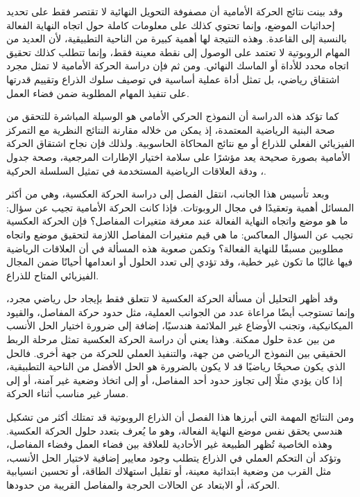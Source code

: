 وقد بينت نتائج الحركة الأمامية أن مصفوفة التحويل النهائية لا تقتصر فقط على تحديد إحداثيات الموضع، وإنما تحتوي كذلك على معلومات كاملة حول اتجاه النهاية الفعالة بالنسبة إلى القاعدة. وهذه النتيجة لها أهمية كبيرة من الناحية التطبيقية، لأن العديد من المهام الروبوتية لا تعتمد على الوصول إلى نقطة معينة فقط، وإنما تتطلب كذلك تحقيق اتجاه محدد للأداة أو الماسك النهائي. ومن ثم فإن دراسة الحركة الأمامية لا تمثل مجرد اشتقاق رياضي، بل تمثل أداة عملية أساسية في توصيف سلوك الذراع وتقييم قدرتها على تنفيذ المهام المطلوبة ضمن فضاء العمل.

كما تؤكد هذه الدراسة أن النموذج الحركي الأمامي هو الوسيلة المباشرة للتحقق من صحة البنية الرياضية المعتمدة، إذ يمكن من خلاله مقارنة النتائج النظرية مع التمركز الفيزيائي الفعلي للذراع أو مع نتائج المحاكاة الحاسوبية. ولذلك فإن نجاح اشتقاق الحركة الأمامية بصورة صحيحة يعد مؤشرًا على سلامة اختيار الإطارات المرجعية، وصحة جدول ، ودقة العلاقات الرياضية المستخدمة في تمثيل السلسلة الحركية.

وبعد تأسيس هذا الجانب، انتقل الفصل إلى دراسة الحركة العكسية، وهي من أكثر المسائل أهمية وتعقيدًا في مجال الروبوتات. فإذا كانت الحركة الأمامية تجيب عن سؤال: ما هو موضع واتجاه النهاية الفعالة عند معرفة متغيرات المفاصل؟ فإن الحركة العكسية تجيب عن السؤال المعاكس: ما هي قيم متغيرات المفاصل اللازمة لتحقيق موضع واتجاه مطلوبين مسبقًا للنهاية الفعالة؟ وتكمن صعوبة هذه المسألة في أن العلاقات الرياضية فيها غالبًا ما تكون غير خطية، وقد تؤدي إلى تعدد الحلول أو انعدامها أحيانًا ضمن المجال الفيزيائي المتاح للذراع.

وقد أظهر التحليل أن مسألة الحركة العكسية لا تتعلق فقط بإيجاد حل رياضي مجرد، وإنما تستوجب أيضًا مراعاة عدد من الجوانب العملية، مثل حدود حركة المفاصل، والقيود الميكانيكية، وتجنب الأوضاع غير الملائمة هندسيًا، إضافة إلى ضرورة اختيار الحل الأنسب من بين عدة حلول ممكنة. وهذا يعني أن دراسة الحركة العكسية تمثل مرحلة الربط الحقيقي بين النموذج الرياضي من جهة، والتنفيذ العملي للحركة من جهة أخرى. فالحل الذي يكون صحيحًا رياضيًا قد لا يكون بالضرورة هو الحل الأفضل من الناحية التطبيقية، إذا كان يؤدي مثلًا إلى تجاوز حدود أحد المفاصل، أو إلى اتخاذ وضعية غير آمنة، أو إلى مسار غير مناسب أثناء الحركة.

ومن النتائج المهمة التي أبرزها هذا الفصل أن الذراع الروبوتية قد تمتلك أكثر من تشكيل هندسي يحقق نفس موضع النهاية الفعالة، وهو ما يُعرف بتعدد حلول الحركة العكسية. وهذه الخاصية تُظهر الطبيعة غير الأحادية للعلاقة بين فضاء العمل وفضاء المفاصل، وتؤكد أن التحكم العملي في الذراع يتطلب وجود معايير إضافية لاختيار الحل الأنسب، مثل القرب من وضعية ابتدائية معينة، أو تقليل استهلاك الطاقة، أو تحسين انسيابية الحركة، أو الابتعاد عن الحالات الحرجة والمفاصل القريبة من حدودها.

